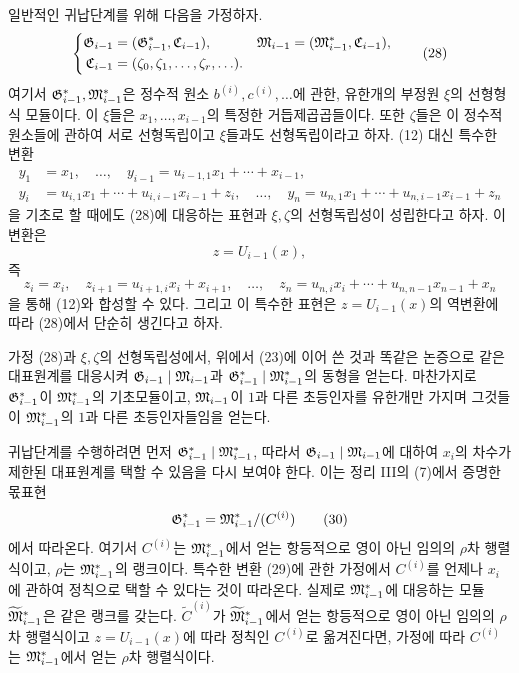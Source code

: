일반적인 귀납단계를 위해 다음을 가정하자.
\begin{equation}
\left\{
\begin{aligned}
\mathfrak G_{i-1}&=(\mathfrak G_{i-1}^*,\mathfrak C_{i-1}),&
\mathfrak M_{i-1}&=(\mathfrak M_{i-1}^*,\mathfrak C_{i-1}),\\
\mathfrak C_{i-1}&=(\zeta_0,\zeta_1,\ldots,\zeta_r,\ldots).
\end{aligned}\right.
\tag{28}
\end{equation}
여기서 \(\mathfrak G^*_{i-1},\mathfrak M^*_{i-1}\)은 정수적 원소 \(b^{(i)},c^{(i)},\ldots\)에 관한, 유한개의 부정원 \(\xi\)의 선형형식 모듈이다. 이 \(\xi\)들은 \(x_1,\ldots,x_{i-1}\)의 특정한 거듭제곱곱들이다. 또한 \(\zeta\)들은 이 정수적 원소들에 관하여 서로 선형독립이고 \(\xi\)들과도 선형독립이라고 하자. (12) 대신 특수한 변환
\begin{equation}
\begin{aligned}
y_1&=x_1,\quad\ldots,\quad
y_{i-1}=u_{i-1,1}x_1+\cdots+x_{i-1},\\
y_i&=u_{i,1}x_1+\cdots+u_{i,i-1}x_{i-1}+z_i,\quad\ldots,\quad
y_n=u_{n,1}x_1+\cdots+u_{n,i-1}x_{i-1}+z_n
\end{aligned}
\tag{29}
\end{equation}
을 기초로 할 때에도 (28)에 대응하는 표현과 \(\xi,\zeta\)의 선형독립성이 성립한다고 하자. 이 변환은
\[
z=U_{i-1}(x),
\]
즉
\[
z_i=x_i,\quad z_{i+1}=u_{i+1,i}x_i+x_{i+1},\quad\ldots,\quad
z_n=u_{n,i}x_i+\cdots+u_{n,n-1}x_{n-1}+x_n
\]
을 통해 (12)와 합성할 수 있다. 그리고 이 특수한 표현은 \(z=U_{i-1}(x)\)의 역변환에 따라 (28)에서 단순히 생긴다고 하자.

가정 (28)과 \(\xi,\zeta\)의 선형독립성에서, 위에서 (23)에 이어 쓴 것과 똑같은 논증으로 같은 대표원계를 대응시켜 \(\mathfrak G_{i-1}\mid\mathfrak M_{i-1}\)과 \(\mathfrak G^*_{i-1}\mid\mathfrak M^*_{i-1}\)의 동형을 얻는다. 마찬가지로 \(\mathfrak G^*_{i-1}\)이 \(\mathfrak M^*_{i-1}\)의 기초모듈이고, \(\mathfrak M_{i-1}\)이 \(1\)과 다른 초등인자를 유한개만 가지며 그것들이 \(\mathfrak M^*_{i-1}\)의 \(1\)과 다른 초등인자들임을 얻는다.

귀납단계를 수행하려면 먼저 \(\mathfrak G^*_{i-1}\mid\mathfrak M^*_{i-1}\), 따라서 \(\mathfrak G_{i-1}\mid\mathfrak M_{i-1}\)에 대하여 \(x_i\)의 차수가 제한된 대표원계를 택할 수 있음을 다시 보여야 한다. 이는 정리 III의 (7)에서 증명한 몫표현
\begin{equation}
\mathfrak G^*_{i-1}=\mathfrak M^*_{i-1}/(C^{(i)})
\tag{30}
\end{equation}
에서 따라온다. 여기서 \(C^{(i)}\)는 \(\mathfrak M^*_{i-1}\)에서 얻는 항등적으로 영이 아닌 임의의 \(\rho\)차 행렬식이고, \(\rho\)는 \(\mathfrak M^*_{i-1}\)의 랭크이다. 특수한 변환 (29)에 관한 가정에서 \(C^{(i)}\)를 언제나 \(x_i\)에 관하여 정칙으로 택할 수 있다는 것이 따라온다. 실제로 \(\mathfrak M^*_{i-1}\)에 대응하는 모듈 \(\widetilde{\mathfrak M}^*_{i-1}\)은 같은 랭크를 갖는다. \(\widetilde C^{(i)}\)가 \(\widetilde{\mathfrak M}^*_{i-1}\)에서 얻는 항등적으로 영이 아닌 임의의 \(\rho\)차 행렬식이고 \(z=U_{i-1}(x)\)에 따라 정칙인 \(C^{(i)}\)로 옮겨진다면, 가정에 따라 \(C^{(i)}\)는 \(\mathfrak M^*_{i-1}\)에서 얻는 \(\rho\)차 행렬식이다.

